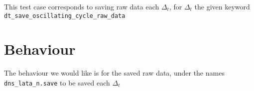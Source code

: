 This test case corresponds to saving raw data each $\Delta_t$, for $\Delta_t$ the given keyword \texttt{dt\_save\_oscillating\_cycle\_raw\_data}

\section{Behaviour}
The behaviour we would like is for the saved raw data, under the names \texttt{dns\_lata\_n.save} to be saved each $\Delta_t$
